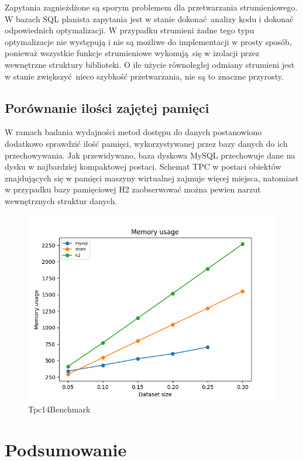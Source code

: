 \documentclass[12pt,twoside,openright]{extarticle}
\begin{document}
    Zapytania zagnieżdżone są sporym problemem dla przetwarzania strumieniowego. W bazach SQL planista zapytania jest w stanie dokonać analizy kodu i dokonać odpowiednich optymalizacji. W przypadku strumieni żadne tego typu optymalizacje nie występują i nie są możliwe do implementacji w prosty sposób, ponieważ wszystkie funkcje strumieniowe wykonują się w izolacji przez wewnętrzne struktury biblioteki. O ile użycie równoległej odmiany strumieni jest w stanie zwiększyć nieco szybkość przetwarzania, nie są to znaczne przyrosty.


\subsection{Porównanie ilości zajętej pamięci}

    W ramach badania wydajności metod dostępu do danych postanowiono dodatkowo sprawdzić ilość pamięci, wykorzystywanej przez bazy danych do ich przechowywania. Jak przewidywano, baza dyskowa MySQL przechowuje dane na dysku w najbardziej kompaktowej postaci. Schemat TPC w postaci obiektów znajdujących się w pamięci maszyny wirtualnej zajmuje więcej miejsca, natomiast w przypadku bazy pamięciowej H2 zaobserwować można pewien narzut wewnętrznych struktur danych.

\begin{figure}[H]
\centering
\includegraphics[width=13cm]{plots/memory}
\caption{Tpc14Benchmark}
    \label{fig:memoryconsumption}
\end{figure}
    

\section{Podsumowanie}
\end{document}
